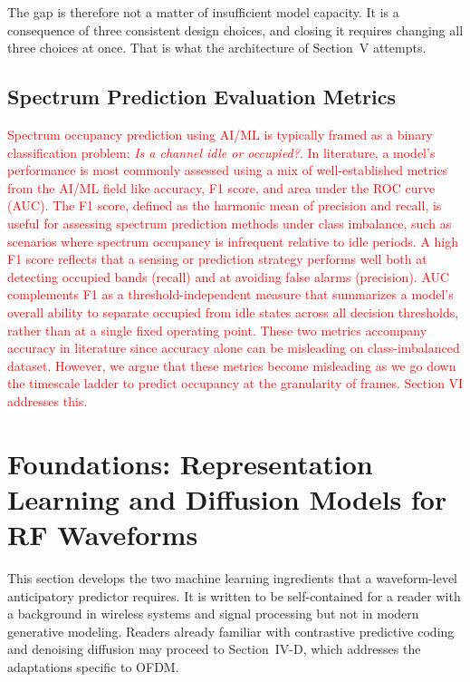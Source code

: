 \documentclass[lettersize,journal]{IEEEtran}
\newcommand{\red}[1]{\textcolor{red}{#1}}
\begin{document}
The gap is therefore not a matter of insufficient model capacity. It is
a consequence of three consistent design choices, and closing it
requires changing all three choices at once. That is what the architecture of
Section~V attempts.

\subsection{\textbf{Spectrum Prediction Evaluation Metrics}}
\red{Spectrum occupancy prediction using AI/ML is typically framed as a binary classification problem: \textit{Is a channel idle or occupied?}. In literature, a model's performance is most commonly assessed using a mix of well-established metrics from the AI/ML field like accuracy, F1 score, and area under the ROC curve (AUC). The F1 score, defined as the harmonic mean of precision and recall, is useful for assessing spectrum prediction methods under class imbalance, such as scenarios where spectrum occupancy is infrequent relative to idle periods. A high F1 score reflects that a sensing or prediction strategy performs well both at detecting occupied bands (recall) and at avoiding false alarms (precision). AUC complements F1 as a threshold-independent measure that summarizes a model's overall ability to separate occupied from idle states across all decision thresholds, rather than at a single fixed operating point. These two metrics accompany accuracy in literature since accuracy alone can be misleading on class-imbalanced dataset. However, we argue that these metrics become misleading as we go down the timescale ladder to predict occupancy at the granularity of frames. Section VI addresses this.}

\section{\textbf{Foundations: Representation Learning and Diffusion Models for RF Waveforms}}

This section develops the two machine learning ingredients that a
waveform-level anticipatory predictor requires. It is written to be
self-contained for a reader with a background in wireless systems and
signal processing but not in modern generative modeling. Readers already
familiar with contrastive predictive coding and denoising diffusion may
proceed to Section~IV-D, which addresses the adaptations specific to
OFDM.
\end{document}
